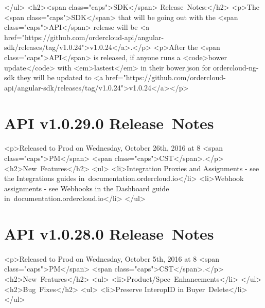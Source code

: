 \documentclass{memoir}%
\begin{document}
</ul>\newline%
<h2><span class="caps">SDK</span> Release~Notes:</h2>\newline%
<p>The <span class="caps">SDK</span> that will be going out with the <span class="caps">API</span> release will be <a href="https://github.com/ordercloud{-}api/angular{-}sdk/releases/tag/v1.0.24">v1.0.24</a>.</p>\newline%
<p>After the <span class="caps">API</span> is released, if anyone runs a <code>bower update</code> with <em>lastest</em> in their bower.json for ordercloud{-}ng{-}sdk they will be updated to <a href="https://github.com/ordercloud{-}api/angular{-}sdk/releases/tag/v1.0.24">v1.0.24</a></p>

%
\section*{API v1.0.29.0 Release~Notes}%
\paragraph*{}%

%
\paragraph*{}%
<p>Released to Prod on Wednesday, October 26th, 2016 at 8 <span class="caps">PM</span> <span class="caps">CST</span>.</p>\newline%
<h2>New~Features</h2>\newline%
<ul>\newline%
<li>Integration Proxies and Assignments {-} see the Integrations guides in~documentation.ordercloud.io</li>\newline%
<li>Webhook assignments {-} see Webhooks in the Dashboard guide in~documentation.ordercloud.io</li>\newline%
</ul>

%
\section*{API v1.0.28.0 Release~Notes}%
\paragraph*{}%

%
\paragraph*{}%
<p>Released to Prod on Wednesday, October 5th, 2016 at 8 <span class="caps">PM</span> <span class="caps">CST</span>.</p>\newline%
<h2>New~Features</h2>\newline%
<ul>\newline%
<li>Product/Spec~Enhancements</li>\newline%
</ul>\newline%
<h2>Bug~Fixes</h2>\newline%
<ul>\newline%
<li>Preserve InteropID in Buyer~Delete</li>\newline%
</ul>
\end{document}
